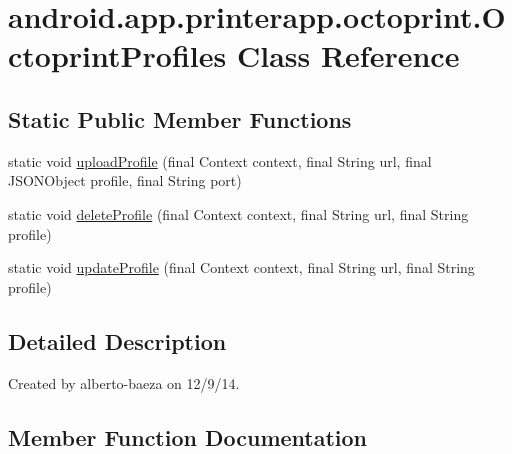 \hypertarget{classandroid_1_1app_1_1printerapp_1_1octoprint_1_1_octoprint_profiles}{}\section{android.\+app.\+printerapp.\+octoprint.\+Octoprint\+Profiles Class Reference}
\label{classandroid_1_1app_1_1printerapp_1_1octoprint_1_1_octoprint_profiles}
\subsection*{Static Public Member Functions}
\begin{DoxyCompactItemize}
\item 
static void \hyperlink{classandroid_1_1app_1_1printerapp_1_1octoprint_1_1_octoprint_profiles_a68cad2ef0aaae8bbdfd552c4fb026736}{upload\+Profile} (final Context context, final String url, final J\+S\+O\+N\+Object profile, final String port)
\item 
static void \hyperlink{classandroid_1_1app_1_1printerapp_1_1octoprint_1_1_octoprint_profiles_af194ba622fde1551f549f641eebd4eae}{delete\+Profile} (final Context context, final String url, final String profile)
\item 
static void \hyperlink{classandroid_1_1app_1_1printerapp_1_1octoprint_1_1_octoprint_profiles_a251abe467462651c9ce9c5052c434df6}{update\+Profile} (final Context context, final String url, final String profile)
\end{DoxyCompactItemize}


\subsection{Detailed Description}
Created by alberto-\/baeza on 12/9/14. 

\subsection{Member Function Documentation}
\mbox{\label{classandroid_1_1app_1_1printerapp_1_1octoprint_1_1_octoprint_profiles_af194ba622fde1551f549f641eebd4eae}} 
